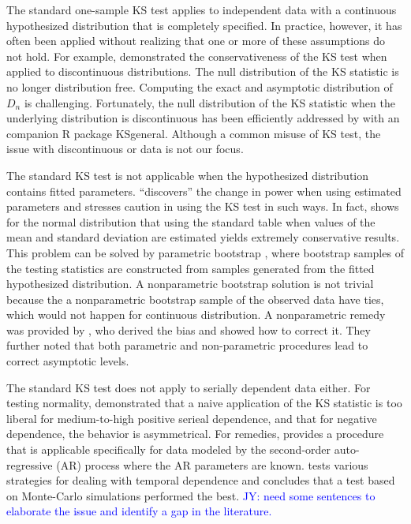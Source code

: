 \documentclass[12pt, letterpaper, titlepage]{article}
\newcommand{\jy}[1]{\textcolor{blue}{JY: #1}}
\begin{document}
The standard one-sample KS test applies to independent data with a continuous
hypothesized distribution that is completely specified. In practice, however, it
has often been applied without realizing that one or more of these assumptions
do not hold. For example, \citet{Noether} demonstrated the conservativeness of
the KS test when applied to discontinuous distributions. The null distribution
of the KS statistic is no longer distribution free. Computing the
exact and asymptotic distribution of $D_n$ is challenging. Fortunately, the null
distribution of the KS statistic when the underlying distribution is
discontinuous has been efficiently addressed by \citet{Dimitrova} with an
companion R package \textsf{KSgeneral}. Although a common misuse of KS test, the
issue with discontinuous or data is not our focus.


The standard KS test is not applicable when the hypothesized distribution
contains fitted parameters. \citet{Steinskog} ``discovers'' the change in power
when using estimated parameters and stresses caution in using the KS test in
such ways. In fact, \citet{Lilliefors} shows for the normal distribution that using the
standard table when values of the mean and standard deviation are estimated
yields extremely conservative results.
This problem can be solved by parametric bootstrap \citep{Efron}, where
bootstrap samples of the testing statistics are constructed from samples
generated from the fitted hypothesized distribution. A nonparametric bootstrap
solution is not trivial because the a nonparametric bootstrap sample of the
observed data have ties, which would not happen for continuous distribution.
A nonparametric remedy was provided by \citet{Babu}, who derived the bias and
showed how to correct it. They further noted that both parametric and
non-parametric procedures lead to correct asymptotic levels.


The standard KS test does not apply to serially dependent data either. For
testing normality, \citet{Durilleul} demonstrated that a naive application of
the KS statistic is too liberal for medium-to-high positive serieal dependence,
and that for negative dependence, the behavior is asymmetrical. For remedies,
\citet{Weiss} provides a procedure that is applicable specifically for data
modeled by the second-order auto-regressive (AR) process where the AR parameters
are known. \citet{Lanzante} tests various strategies for dealing with temporal
dependence and concludes that a test based on Monte-Carlo simulations performed
the best. \jy{need some sentences to elaborate the issue and identify a gap in
  the literature.}
\end{document}
